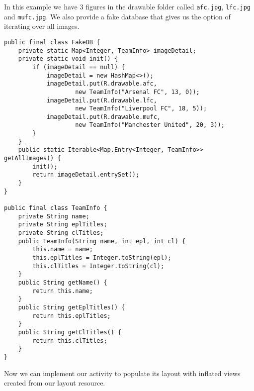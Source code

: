 In this example we have 3 figures in the drawable folder called \texttt{afc.jpg}, \texttt{lfc.jpg} and \texttt{mufc.jpg}. We also provide a fake database that gives us the option of iterating over all images.

\begin{lstlisting}[style=A_Java]
public final class FakeDB {
    private static Map<Integer, TeamInfo> imageDetail;
    private static void init() {
        if (imageDetail == null) {
            imageDetail = new HashMap<>();
            imageDetail.put(R.drawable.afc,
                    new TeamInfo("Arsenal FC", 13, 0));
            imageDetail.put(R.drawable.lfc,
                    new TeamInfo("Liverpool FC", 18, 5));
            imageDetail.put(R.drawable.mufc,
                    new TeamInfo("Manchester United", 20, 3));
        }
    }
    public static Iterable<Map.Entry<Integer, TeamInfo>> getAllImages() {
        init();
        return imageDetail.entrySet();
    }
}

public final class TeamInfo {
    private String name;
    private String eplTitles;
    private String clTitles;
    public TeamInfo(String name, int epl, int cl) {
        this.name = name;
        this.eplTitles = Integer.toString(epl);
        this.clTitles = Integer.toString(cl);
    }
    public String getName() {
        return this.name;
    }
    public String getEplTitles() {
        return this.eplTitles;
    }
    public String getClTitles() {
        return this.clTitles;
    }
}
\end{lstlisting}

Now we can implement our activity to populate its layout with inflated views created from our layout resource.

